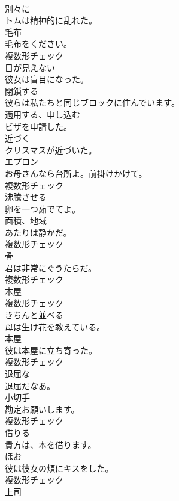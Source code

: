 \documentclass[8pt]{extreport}
\begin{document}
\begin{CJK}{UTF8}{min}
\\	[副詞]	別々に	
\\	トムは精神的に乱れた。	
\\	[名詞]	毛布	
\\	毛布をください。	
\\	複数形チェック
\\	[形容詞]	目が見えない	
\\	彼女は盲目になった。	
\\	[動詞]	閉鎖する	
\\	彼らは私たちと同じブロックに住んでいます。	
\\	[動詞]	適用する、申し込む	
\\	ビザを申請した。	
\\	[動詞]	近づく	
\\	クリスマスが近づいた。	
\\	[名詞]	エプロン	
\\	お母さんなら台所よ。前掛けかけて。	
\\	複数形チェック
\\	[動詞]	沸騰させる	
\\	卵を一つ茹でてよ。	
\\	[名詞]	面積、地域	
\\	あたりは静かだ。	
\\	複数形チェック
\\	[名詞]	骨	
\\	君は非常にぐうたらだ。	
\\	複数形チェック
\\	[名詞]	本屋	
\\	複数形チェック
\\	[動詞]	きちんと並べる	
\\	母は生け花を教えている。	
\\	[名詞]	本屋	
\\	彼は本屋に立ち寄った。	
\\	複数形チェック
\\	[形容詞]	退屈な	
\\	退屈だなあ。	
\\	[名詞]	小切手	
\\	勘定お願いします。	
\\	複数形チェック
\\	[動詞]	借りる	
\\	貴方は、本を借ります。	
\\	[名詞]	ほお	
\\	彼は彼女の頬にキスをした。	
\\	複数形チェック
\\	[名詞]	上司	

\end{CJK}
\end{document}

